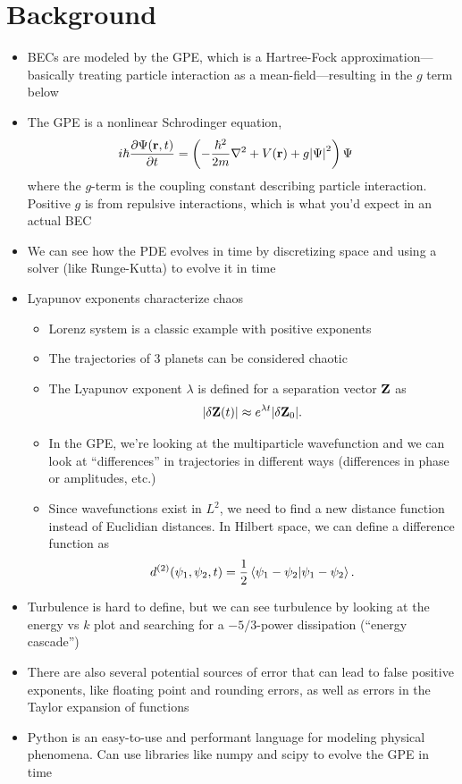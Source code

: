\documentclass{homework}
\begin{document}
	\section{Background} 
	\begin{itemize}
		\item BECs are modeled by the GPE, which is a Hartree-Fock approximation---basically treating particle interaction as a mean-field---resulting in the $g$ term below
		
		\item The GPE is a nonlinear Schrodinger equation, \begin{align*}
			i \hbar \pdv{\Psi(\bvec{r}, t)}{t} & = \left(
			-\frac{\hbar^2}{2m} \laplacian + V(\bvec{r}) + g\abs{\Psi}^2
			\right) \Psi
		\end{align*}
		where the $g$-term is the coupling constant describing particle interaction. Positive $g$ is from repulsive interactions, which is what you'd expect in an actual BEC
		
		\item We can see how the PDE evolves in time by discretizing space and using a solver (like Runge-Kutta) to evolve it in time
		
		\item Lyapunov exponents characterize chaos \begin{itemize}
			\item Lorenz system is a classic example with positive exponents
			\item The trajectories of 3 planets can be considered chaotic
			\item The Lyapunov exponent $\lambda$ is defined for a separation vector $\boldsymbol{\mathrm{Z}}$ as 
			$$\abs{\delta \boldsymbol{\mathrm{Z}}(t)} \approx e^{\lambda t} \abs{\delta \boldsymbol{\mathrm{Z}}_0}.$$
			
			\item In the GPE, we're looking at the multiparticle wavefunction and we can look at ``differences'' in trajectories in different ways (differences in phase or amplitudes, etc.)
			\item Since wavefunctions exist in $L^2$, we need to find a new distance function instead of Euclidian distances. In Hilbert space, we can define a difference function as $$d^{(2)}(\psi_1, \psi_2, t) = \frac{1}{2} \braket{\psi_1 - \psi_2}{\psi_1 - \psi_2}.$$
		\end{itemize}
		
		\item Turbulence is hard to define, but we can see turbulence by looking at the energy vs $k$ plot and searching for a $-5/3$-power dissipation (``energy cascade'')
		\item There are also several potential sources of error that can lead to false positive exponents, like floating point and rounding errors, as well as errors in the Taylor expansion of functions
		
		\item Python is an easy-to-use and performant language for modeling physical phenomena. Can use libraries like numpy and scipy to evolve the GPE in time
	\end{itemize}
	
\end{document}
